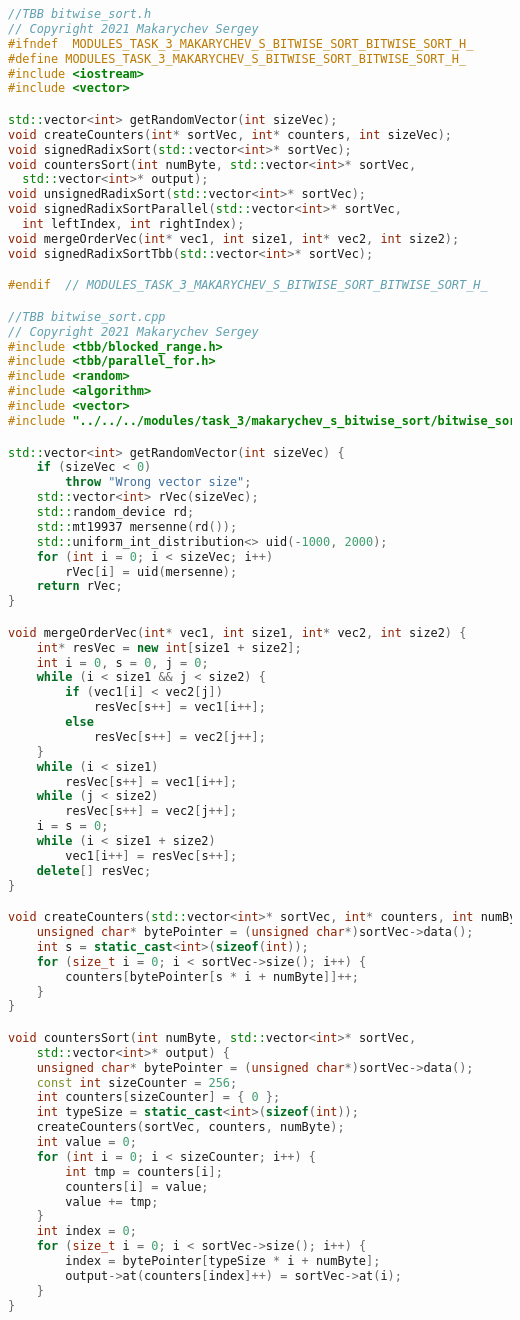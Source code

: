\documentclass{report}
\begin{document}
\begin{lstlisting}[language=C++]
//TBB bitwise_sort.h
// Copyright 2021 Makarychev Sergey
#ifndef  MODULES_TASK_3_MAKARYCHEV_S_BITWISE_SORT_BITWISE_SORT_H_
#define MODULES_TASK_3_MAKARYCHEV_S_BITWISE_SORT_BITWISE_SORT_H_
#include <iostream>
#include <vector>

std::vector<int> getRandomVector(int sizeVec);
void createCounters(int* sortVec, int* counters, int sizeVec);
void signedRadixSort(std::vector<int>* sortVec);
void countersSort(int numByte, std::vector<int>* sortVec,
  std::vector<int>* output);
void unsignedRadixSort(std::vector<int>* sortVec);
void signedRadixSortParallel(std::vector<int>* sortVec,
  int leftIndex, int rightIndex);
void mergeOrderVec(int* vec1, int size1, int* vec2, int size2);
void signedRadixSortTbb(std::vector<int>* sortVec);

#endif  // MODULES_TASK_3_MAKARYCHEV_S_BITWISE_SORT_BITWISE_SORT_H_

//TBB bitwise_sort.cpp
// Copyright 2021 Makarychev Sergey
#include <tbb/blocked_range.h>
#include <tbb/parallel_for.h>
#include <random>
#include <algorithm>
#include <vector>
#include "../../../modules/task_3/makarychev_s_bitwise_sort/bitwise_sort.h"

std::vector<int> getRandomVector(int sizeVec) {
    if (sizeVec < 0)
        throw "Wrong vector size";
    std::vector<int> rVec(sizeVec);
    std::random_device rd;
    std::mt19937 mersenne(rd());
    std::uniform_int_distribution<> uid(-1000, 2000);
    for (int i = 0; i < sizeVec; i++)
        rVec[i] = uid(mersenne);
    return rVec;
}

void mergeOrderVec(int* vec1, int size1, int* vec2, int size2) {
    int* resVec = new int[size1 + size2];
    int i = 0, s = 0, j = 0;
    while (i < size1 && j < size2) {
        if (vec1[i] < vec2[j])
            resVec[s++] = vec1[i++];
        else
            resVec[s++] = vec2[j++];
    }
    while (i < size1)
        resVec[s++] = vec1[i++];
    while (j < size2)
        resVec[s++] = vec2[j++];
    i = s = 0;
    while (i < size1 + size2)
        vec1[i++] = resVec[s++];
    delete[] resVec;
}

void createCounters(std::vector<int>* sortVec, int* counters, int numByte) {
    unsigned char* bytePointer = (unsigned char*)sortVec->data();
    int s = static_cast<int>(sizeof(int));
    for (size_t i = 0; i < sortVec->size(); i++) {
        counters[bytePointer[s * i + numByte]]++;
    }
}

void countersSort(int numByte, std::vector<int>* sortVec,
    std::vector<int>* output) {
    unsigned char* bytePointer = (unsigned char*)sortVec->data();
    const int sizeCounter = 256;
    int counters[sizeCounter] = { 0 };
    int typeSize = static_cast<int>(sizeof(int));
    createCounters(sortVec, counters, numByte);
    int value = 0;
    for (int i = 0; i < sizeCounter; i++) {
        int tmp = counters[i];
        counters[i] = value;
        value += tmp;
    }
    int index = 0;
    for (size_t i = 0; i < sortVec->size(); i++) {
        index = bytePointer[typeSize * i + numByte];
        output->at(counters[index]++) = sortVec->at(i);
    }
}


\end{lstlisting}
\end{document}
